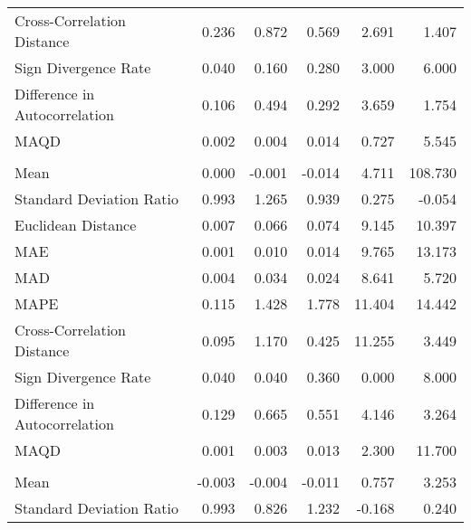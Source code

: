 \begin{landscape}
\begin{ThreePartTable}
\begin{longtable}[t]{lrrrrr}
\hspace{1em}Cross-Correlation Distance & 0.236 & 0.872 & 0.569 & 2.691 & 1.407\\
\hspace{1em}Sign Divergence Rate & 0.040 & 0.160 & 0.280 & 3.000 & 6.000\\
\hspace{1em}Difference in Autocorrelation & 0.106 & 0.494 & 0.292 & 3.659 & 1.754\\
\hspace{1em}MAQD & 0.002 & 0.004 & 0.014 & 0.727 & 5.545\\
\addlinespace[0.5em]
\multicolumn{6}{l}{\textbf{CHN}}\\
\hline
\hspace{1em}Mean & 0.000 & -0.001 & -0.014 & 4.711 & 108.730\\
\hspace{1em}Standard Deviation Ratio & 0.993 & 1.265 & 0.939 & 0.275 & -0.054\\
\hspace{1em}Euclidean Distance & 0.007 & 0.066 & 0.074 & 9.145 & 10.397\\
\hspace{1em}MAE & 0.001 & 0.010 & 0.014 & 9.765 & 13.173\\
\hspace{1em}MAD & 0.004 & 0.034 & 0.024 & 8.641 & 5.720\\
\hspace{1em}MAPE & 0.115 & 1.428 & 1.778 & 11.404 & 14.442\\
\hspace{1em}Cross-Correlation Distance & 0.095 & 1.170 & 0.425 & 11.255 & 3.449\\
\hspace{1em}Sign Divergence Rate & 0.040 & 0.040 & 0.360 & 0.000 & 8.000\\
\hspace{1em}Difference in Autocorrelation & 0.129 & 0.665 & 0.551 & 4.146 & 3.264\\
\hspace{1em}MAQD & 0.001 & 0.003 & 0.013 & 2.300 & 11.700\\
\addlinespace[0.5em]
\multicolumn{6}{l}{\textbf{CIV}}\\
\hline
\hspace{1em}Mean & -0.003 & -0.004 & -0.011 & 0.757 & 3.253\\
\hspace{1em}Standard Deviation Ratio & 0.993 & 0.826 & 1.232 & -0.168 & 0.240\\

\end{longtable}
\end{ThreePartTable}
\end{landscape}

